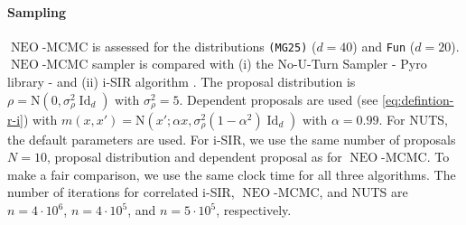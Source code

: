 \documentclass{article}
\def\Normal{\mathrm{N}}
\def\IFIS{\ensuremath{\operatorname{NEO}}}
\def\InFiNE{{\small \IFIS}}
\def\Id{\operatorname{Id}}
\newcommand{\1}{\mathds{1}}
\def\Id{\operatorname{Id}}
\def\Id{\operatorname{Id}}
\def\proposal{\rho}
\begin{document}
\paragraph{Sampling}
\label{subsec:mcmc_exp}
\InFiNE-MCMC  is assessed  for the distributions \texttt{(MG25)} ($d=40$) and \texttt{Fun} ($d=20$).   \InFiNE-MCMC sampler is compared with (i) the No-U-Turn Sampler - Pyro library \cite{bingham2019pyro} - and (ii) i-SIR algorithm \cite{ruiz:titsias:doucet:2020}. The proposal distribution is $\proposal = \Normal(0,\sigma^2_\rho \Id_d)$ with $\sigma^2_\rho = 5$.
Dependent proposals are used (see \eqref{eq:defintion-r-i}) with $m(x,x')= \Normal(x';\alpha x, \sigma^2_\rho(1-\alpha^2)  \Id_d)$ with $\alpha=0.99$.
For NUTS, the default parameters are used. 
For i-SIR, we use the same number of proposals $N=10$,  proposal distribution and dependent proposal as for \IFIS-MCMC.  
To make a fair comparison, we use the same clock time for all three algorithms. The number of iterations for correlated i-SIR, \IFIS-MCMC, and NUTS are $n= 4\cdot 10^6$, $n= 4 \cdot 10^5$, and $n= 5 \cdot 10^5$, respectively.
\end{document}
